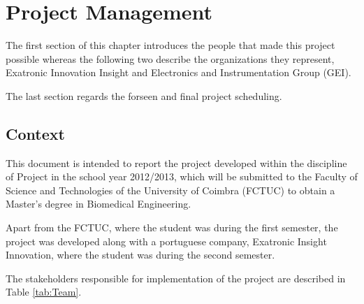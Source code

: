 
\chapter{Project Management} %

\label{Chapter2} %



The first section of this chapter introduces the people that made this project possible whereas the following two describe the organizations they represent, Exatronic Innovation Insight and Electronics and Instrumentation Group (GEI).

The last section regards the forseen and final project scheduling.

\section{Context}

This document is intended to report the project developed within the discipline of Project in the school year 2012/2013, which will be submitted to the Faculty of Science and Technologies of the University of Coimbra (FCTUC) to obtain a Master's degree in Biomedical Engineering.

Apart from the FCTUC, where the student was during the first semester, the project was developed along with a portuguese company, Exatronic Insight Innovation, where the student was during the second semester.

The stakeholders responsible for implementation of the project are described in Table \ref{tab:Team}.

